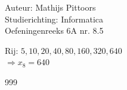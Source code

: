 \documentclass[a4paper]{article}
\begin{document}
  
\noindent \large Auteur: Mathijs Pittoors \\
\noindent \large Studierichting: Informatica\\
\noindent \large Oefeningenreeks 6A nr. 8.5\\

\medskip

\normalsize

Rij: $5, 10, 20, 40, 80, 160, 320, 640$\\

$\Rightarrow x_8 = 640$
\begin{thebibliography}{999}
\end{thebibliography}
\end{document}
